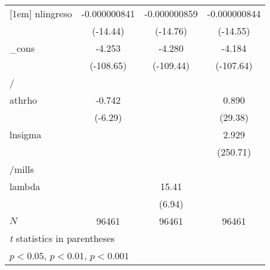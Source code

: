 {\begin{tabular}{l*{3}{c}}
[1em]
nlingreso   &-0.000000841\sym{***}&-0.000000859\sym{***}&-0.000000844\sym{***}\\
            &    (-14.44)         &    (-14.76)         &    (-14.55)         \\
[1em]
\_cons      &      -4.253\sym{***}&      -4.280\sym{***}&      -4.184\sym{***}\\
            &   (-108.65)         &   (-109.44)         &   (-107.64)         \\
\hline
/           &                     &                     &                     \\
athrho      &      -0.742\sym{***}&                     &       0.890\sym{***}\\
            &     (-6.29)         &                     &     (29.38)         \\
[1em]
lnsigma     &                     &                     &       2.929\sym{***}\\
            &                     &                     &    (250.71)         \\
\hline
/mills      &                     &                     &                     \\
lambda      &                     &       15.41\sym{***}&                     \\
            &                     &      (6.94)         &                     \\
\hline
\(N\)       &       96461         &       96461         &       96461         \\
\hline\hline
\multicolumn{4}{l}{\footnotesize \textit{t} statistics in parentheses}\\
\multicolumn{4}{l}{\footnotesize \sym{*} \(p<0.05\), \sym{**} \(p<0.01\), \sym{***} \(p<0.001\)}\\
\end{tabular}
}
